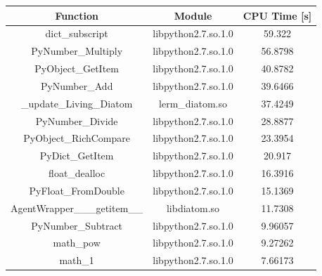 \documentclass[t]{beamer}
\begin{document}
\begin{frame}[c]
	\small
	\begin{table}
	    \begin{tabular}{|c|c||c|}
	    \hline
	    Function                      & Module              & CPU Time [s]  \\ \hline
	    \rowcolor{babyblue}
	    dict\_subscript               & libpython2.7.so.1.0 & 59.322        \\
	    \rowcolor{babyblue}
	    PyNumber\_Multiply            & libpython2.7.so.1.0 & 56.8798       \\
	    \rowcolor{babyblue}
	    PyObject\_GetItem             & libpython2.7.so.1.0 & 40.8782       \\
	    \rowcolor{babyblue}
	    PyNumber\_Add                 & libpython2.7.so.1.0 & 39.6466       \\
	    \_update\_Living\_Diatom      & lerm\_diatom.so     & 37.4249       \\
	    \rowcolor{babyblue}
	    PyNumber\_Divide              & libpython2.7.so.1.0 & 28.8877       \\
	    \rowcolor{babyblue}
	    PyObject\_RichCompare         & libpython2.7.so.1.0 & 23.3954       \\
	    \rowcolor{babyblue}
	    PyDict\_GetItem               & libpython2.7.so.1.0 & 20.917        \\
	    \rowcolor{babyblue}
	    float\_dealloc                & libpython2.7.so.1.0 & 16.3916       \\
	    \rowcolor{babyblue}
	    PyFloat\_FromDouble           & libpython2.7.so.1.0 & 15.1369       \\
	    AgentWrapper\_\_\_getitem\_\_ & libdiatom.so        & 11.7308       \\
	    \rowcolor{babyblue}
	    PyNumber\_Subtract            & libpython2.7.so.1.0 & 9.96057       \\
	    math\_pow                     & libpython2.7.so.1.0 & 9.27262       \\
	    math\_1                       & libpython2.7.so.1.0 & 7.66173       \\ \hline
	    \end{tabular}
	    \label{table:vtune-embedded-profile}
	\end{table}
\end{frame}
\end{document}
